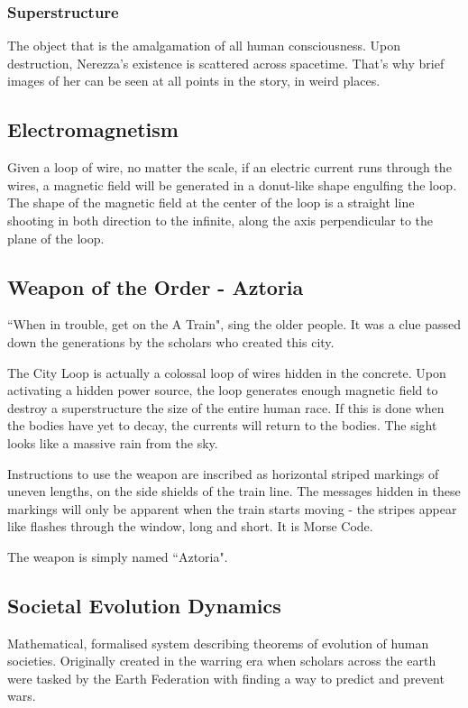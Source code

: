 \documentclass[11pt]{article}
\begin{document}
		\subsubsection{Superstructure}
		The object that is the amalgamation of all human consciousness. Upon destruction, Nerezza's existence is scattered across spacetime. That's why brief images of her can be seen at all points in the story, in weird places.
	
	\subsection{Electromagnetism}
	Given a loop of wire, no matter the scale, if an electric current runs through the wires, a magnetic field will be generated in a donut-like shape engulfing the loop. 
	The shape of the magnetic field at the center of the loop is a straight line shooting in both direction to the infinite, along the axis perpendicular to the plane of the loop.
	
	\subsection{Weapon of the Order - Aztoria}
	``When in trouble, get on the A Train", sing the older people. 
	It was a clue passed down the generations by the scholars who created this city. 
	
	The City Loop is actually a colossal loop of wires hidden in the concrete. 
	Upon activating a hidden power source, the loop generates enough magnetic field to destroy a superstructure the size of the entire human race. 
	If this is done when the bodies have yet to decay, the currents will return to the bodies. The sight looks like a massive rain from the sky.
	
	Instructions to use the weapon are inscribed as horizontal striped markings of uneven lengths, on the side shields of the train line. 
	The messages hidden in these markings will only be apparent when the train starts moving - the stripes appear like flashes through the window, long and short. 
	It is Morse Code.
	
	The weapon is simply named ``Aztoria".
	
	\subsection{Societal Evolution Dynamics}
	Mathematical, formalised system describing theorems of evolution of human societies. 
	Originally created in the warring era when scholars across the earth were tasked by the Earth Federation with finding a way to predict and prevent wars.
	
\end{document}
